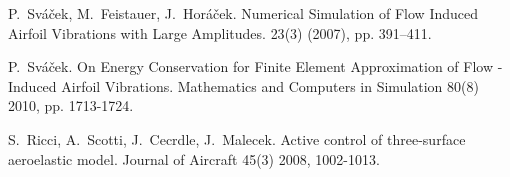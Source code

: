 
\begin{thebibliography}{10}



{\sc P.~Sv\'{a}\v{c}ek, M.~Feistauer, J.~Hor\'{a}\v{c}ek}.
\newblock Numerical Simulation of Flow Induced Airfoil Vibrations with Large Amplitudes.
 {23}(3) (2007), pp. 391--411.

{\sc P.~Sv\'{a}\v{c}ek}. 
On Energy Conservation for Finite Element Approximation of Flow - Induced Airfoil Vibrations.
\newblock Mathematics and Computers in Simulation 80(8) 2010, pp. 1713-1724.


{\sc S.~Ricci, A.~Scotti, J.~Cecrdle, J.~Malecek}.
Active control of three-surface aeroelastic model.
\newblock Journal of Aircraft 45(3) 2008, 1002-1013.

\end{thebibliography}


